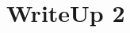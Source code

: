 \documentclass[onecolumn, draftclsnofoot,10pt, compsoc]{IEEEtran}
\begin{document}

\section{WriteUp 2}
\end{document}

